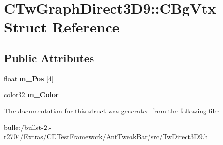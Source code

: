 \hypertarget{struct_c_tw_graph_direct3_d9_1_1_c_bg_vtx}{\section{C\+Tw\+Graph\+Direct3\+D9\+:\+:C\+Bg\+Vtx Struct Reference}
\label{struct_c_tw_graph_direct3_d9_1_1_c_bg_vtx}
}
\subsection*{Public Attributes}
\begin{DoxyCompactItemize}
\item 
\hypertarget{struct_c_tw_graph_direct3_d9_1_1_c_bg_vtx_a60044ccfb6834fa4c1ded88effba2889}{float {\bfseries m\+\_\+\+Pos} \mbox{[}4\mbox{]}}\label{struct_c_tw_graph_direct3_d9_1_1_c_bg_vtx_a60044ccfb6834fa4c1ded88effba2889}

\item 
\hypertarget{struct_c_tw_graph_direct3_d9_1_1_c_bg_vtx_a39a3078a56e5bb4390a8ba012392a533}{color32 {\bfseries m\+\_\+\+Color}}\label{struct_c_tw_graph_direct3_d9_1_1_c_bg_vtx_a39a3078a56e5bb4390a8ba012392a533}

\end{DoxyCompactItemize}


The documentation for this struct was generated from the following file\+:\begin{DoxyCompactItemize}
\item 
bullet/bullet-\/2.-\/r2704/\+Extras/\+C\+D\+Test\+Framework/\+Ant\+Tweak\+Bar/src/Tw\+Direct3\+D9.\+h\end{DoxyCompactItemize}

